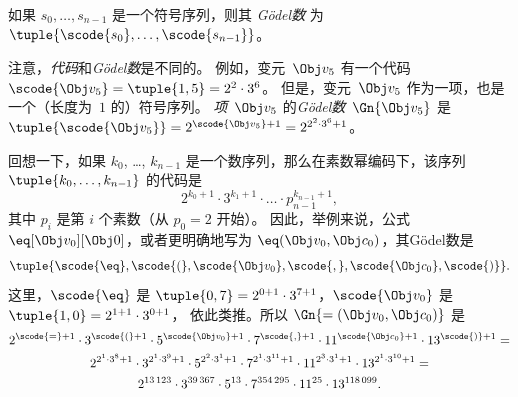 \documentclass[../../../include/open-logic-section]{subfiles}
\begin{document}
\begin{defn}
如果 $s_0, \dots, s_{n-1}$ 是一个符号序列，则其 \emph{Gödel数} 为 $\tuple{\scode{s_0}, \dots, \scode{s_{n-1}}}$。
\end{defn}

\begin{explain}
注意，\emph{代码}和\emph{Gödel数}是不同的。
例如，变元~$\Obj v_5$ 有一个代码~$\scode{\Obj
  v_5} = \tuple{1, 5} = 2^2\cdot 3^6$。
但是，变元~$\Obj v_5$ 作为一项，也是一个（长度为~$1$ 的）符号序列。
\emph{项}~$\Obj v_5$ 的\emph{Gödel数}~$\Gn{\Obj v_5}$ 是 $\tuple{\scode{\Obj v_5}} = 2^{\scode{\Obj
    v_5} + 1} = 2^{2^2\cdot 3^6 + 1}$。
\end{explain}

\begin{ex}
回想一下，如果 $k_0$, \dots, $k_{n-1}$ 是一个数序列，那么在素数幂编码下，该序列 $\tuple{k_0, \dots, k_{n-1}}$ 的代码是
\[
2^{k_0+1}\cdot3^{k_1+1}\cdot \dots \cdot p_{n-1}^{k_{n-1}+1},
\]
其中 $p_i$ 是第 $i$ 个素数（从 $p_0 = 2$ 开始）。
因此，举例来说，公式 $\eq[\Obj v_0][\Obj 0]$，或者更明确地写为 ${\eq}(\Obj v_0,\Obj c_0)$，其Gödel数是
\[
\tuple{\scode{\eq},\scode{(},\scode{\Obj v_0},\scode{,}, \scode{\Obj
    c_0},\scode{)}}.
\]
这里，$\scode{\eq}$ 是 $\tuple{0,7} = 2^{0+1}\cdot
3^{7+1}$，$\scode{\Obj v_0}$ 是 $\tuple{1,0} = 2^{1+1}\cdot3^{0+1}$，
依此类推。所以 $\Gn{=(\Obj v_0,\Obj c_0)}$ 是
\begin{multline*}
2^{\scode{=} + 1}\cdot 3^{\scode{(}+1}\cdot 5^{\scode{\Obj v_0}+1}
\cdot 7^{\scode{,} + 1} \cdot 11^{\scode{\Obj c_0}+1} \cdot
13^{\scode{)}+1} = \\
2^{2^1\cdot 3^8 + 1}\cdot 3^{2^1\cdot 3^9+1}\cdot 5^{2^2\cdot 3^1+1}
\cdot 7^{2^1\cdot 3^{11} + 1} \cdot 11^{2^3\cdot3^1+1} \cdot
13^{2^1\cdot3^{10}+1} = \\
2^{13\,123}\cdot 3^{39\,367}\cdot 5^{13}\cdot 7^{354\,295}\cdot11^{25}\cdot13^{118\,099}.
\end{multline*}
\end{ex}
\end{document}
